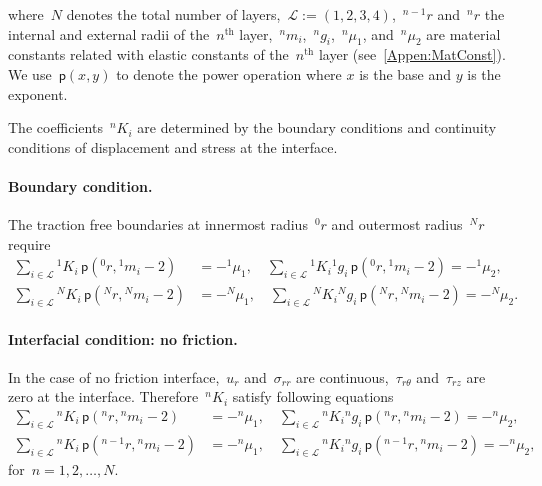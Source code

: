 \documentclass[preprint,10pt,times]{elsarticle}
\numberwithin{equation}{section}
\newcommand{\pr}[1]{\left( #1 \right)}
\newcommand{\p}{\,\mathsf{p}}
\renewcommand{\>}{$\Rightarrow$}
\begin{document}
where~$N$ denotes the total number of layers,~$\mathcal{L} := \pr{1,2,3,4}$,~${}^{n-1}\!{r}$ and~${}^{n}\!{r}$ the internal and external radii of the~$n^\text{th}$ layer,~${}^{n}\!{m_{i}}$,~${}^{n}\!{g_{i}}$,~${}^{n}\!{\mu_{1}}$, and~${}^{n}\!{\mu_{2}}$ are material constants related with elastic constants of the~$n^\text{th}$ layer (see~\ref{Appen:MatConst}). We use $\p\pr{x,y}$ to denote the power operation where $x$ is the base and $y$ is the exponent.

The coefficients~${}^{n}\!{K_{i}}$ are determined by the boundary conditions and continuity conditions of displacement and stress at the interface.

\paragraph{Boundary condition.}

The traction free boundaries at innermost radius~${}^{0}\!{r}$ and outermost radius~${}^{N}\!{r}$ require
\begin{subequations}
	\begin{align}
	\sum_{i \in \mathcal{L}} {}^{1}\!{K_{i}} \p\pr{{}^{0}\!{r},{}^{1}\!{m_{i}} - 2} & = -{}^{1}\!{\mu_{1}}, \quad
	\sum_{i \in \mathcal{L}} {}^{1}\!{K_{i}} {}^{1}\!{g_{i}} \p\pr{{}^{0}\!{r},{}^{1}\!{m_{i}} - 2} = -{}^{1}\!{\mu_{2}},\\
	\sum_{i \in \mathcal{L}} {}^{N}\!{K_{i}} \p\pr{{}^{N}\!{r},{}^{N}\!{m_{i}} - 2} & = -{}^{N}\!{\mu_{1}}, \quad
	\sum_{i \in \mathcal{L}} {}^{N}\!{K_{i}} {}^{N}\!{g_{i}} \p\pr{{}^{N}\!{r},{}^{N}\!{m_{i}} - 2} = -{}^{N}\!{\mu_{2}}.
	\end{align}
	\label{eq:boundary}
\end{subequations}

\paragraph{Interfacial condition: no friction.}

In the case of no friction interface,~$u_r$ and~$\sigma_{rr}$ are continuous,~$\tau_{r\theta}$ and~$\tau_{rz}$ are zero at the interface. Therefore~${}^{n}\!{K_{i}}$ satisfy following equations
\begin{subequations}
	\begin{align}
	\sum_{i \in \mathcal{L}} {}^{n}\!{K_{i}} \p\pr{{}^{n}\!{r},{}^{n}\!{m_{i}} - 2} & = -{}^{n}\!{\mu_{1}}, \quad
	\sum_{i \in \mathcal{L}} {}^{n}\!{K_{i}} {}^{n}\!{g_{i}} \p\pr{{}^{n}\!{r},{}^{n}\!{m_{i}} - 2} = -{}^{n}\!{\mu_{2}}, \\
	\sum_{i \in \mathcal{L}} {}^{n}\!{K_{i}} \p\pr{{}^{n-1}\!{r},{}^{n}\!{m_{i}} - 2} & = -{}^{n}\!{\mu_{1}}, \quad
	\sum_{i \in \mathcal{L}} {}^{n}\!{K_{i}} {}^{n}\!{g_{i}} \p\pr{{}^{n-1}\!{r},{}^{n}\!{m_{i}} - 2} = -{}^{n}\!{\mu_{2}},
	\end{align}
	\label{eq:nofriction_interface}
\end{subequations}
for~$n = 1,2,\dots,N$.
\end{document}
